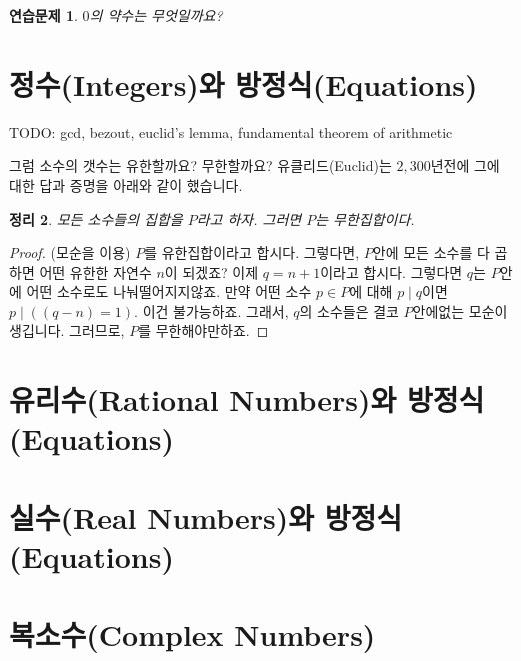 \documentclass[a4paper, 11pt]{report}
\renewcommand{\<}{\langle}
\renewcommand{\>}{\rangle}
\newtheorem{thm}{정리}[section]
\newtheorem{exercise}[thm]{연습문제}
\begin{document}
\begin{exercise}
  $0$의 약수는 무엇일까요? 
\end{exercise}

\section{정수(Integers)와 방정식(Equations)}


TODO: gcd, bezout, euclid's lemma, fundamental theorem of arithmetic


그럼 소수의 갯수는 유한할까요? 무한할까요? 유클리드(Euclid)는 $2,300$년전에 그에 대한 답과
증명을 아래와 같이 했습니다.

\begin{thm}
  모든 소수들의 집합을 $P$라고 하자. 그러면 $P$는 무한집합이다. 
\end{thm}

\begin{proof}
  (모순을 이용) $P$를 유한집합이라고 합시다. 그렇다면, $P$안에 모든 소수를 다 곱하면 어떤 유한한 
  자연수 $n$이 되겠죠? 이제 $q = n+1$이라고 합시다. 그렇다면 $q$는 $P$안에 어떤 소수로도 나눠떨어지지않죠.
  만약 어떤 소수 $p \in P$에 대해 $p \mid q$이면 $p \mid ((q-n) = 1)$. 이건 불가능하죠.
  그래서, $q$의 소수들은 결코 $P$안에없는 모순이 생깁니다. 그러므로, $P$를 무한해야만하죠.
\end{proof}

\section{유리수(Rational Numbers)와 방정식(Equations)}

\section{실수(Real Numbers)와 방정식(Equations)}

\section{복소수(Complex Numbers)} 



\end{document}

